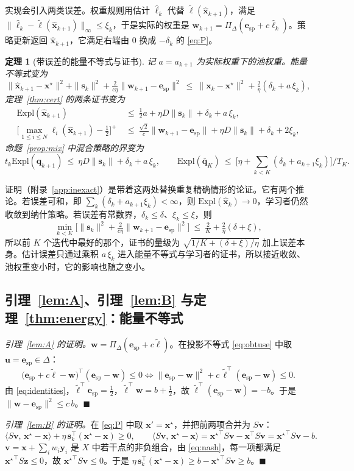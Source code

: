 \documentclass{article}
\theoremstyle{plain}
\newtheorem{theorem}{定理}[section]
\theoremstyle{remark}
\newcommand{\Expl}{\mathrm{Expl}}
\newcommand{\Proj}{\Pi}
\newcommand{\simplex}{\Delta}
\newcommand{\bx}{{\bm{x}}}
\newcommand{\by}{{\bm{y}}}
\newcommand{\bv}{{\bm{v}}}
\newcommand{\bw}{{\bm{w}}}
\newcommand{\bz}{{\bm{z}}}
\newcommand{\bu}{{\bm{u}}}
\newcommand{\bq}{{\bm{q}}}
\newcommand{\be}{{\bm{e}}}
\newcommand{\bell}{{\bm{\ell}}}
\newcommand{\aug}{\tilde{\bell}}
\newcommand{\xs}{\bx^{\star}}
\newcommand{\dx}{{\bm{s}}}
\newcommand{\esp}{\be_{\mathrm{sp}}}
\begin{document}
实现会引入两类误差。权重规则用估计 $\hat{\bell}_k$ 代替 $\aug(\hat \bx_{k+1})$，满足 $\|\hat{\bell}_k-\aug(\hat \bx_{k+1})\|_\infty\le\xi_k$，于是实际的权重是 $\bw_{k+1}=\Proj_\simplex(\esp+c\hat{\bell}_k)$。策略更新返回 $\hat \bx_{k+1}$，它满足右端由 $0$ 换成 $-\delta_k$ 的 \eqref{eq:P}。
\begin{theorem}[带误差的能量不等式与证书]
\label{thm:inexact}
记 $a=a_{k+1}$ 为实际权重下的池权重。能量不等式变为
\[
\|\hat \bx_{k+1}-\xs\|^2+\|\dx_k\|^2+\tfrac{2}{c\eta}\|\bw_{k+1}-\esp\|^2\ \le\ \|\bx_k-\xs\|^2+\tfrac2\eta(\delta_k+a\,\xi_k),
\]
定理~\ref{thm:cert} 的两条证书变为
\begin{align*}
\Expl(\hat \bx_{k+1})&\ \le\ \tfrac12a+\eta D\|\dx_k\|+\delta_k+a\,\xi_k,\\
\Big[\max_{1\le i\le N}\ell_i(\hat \bx_{k+1})-\tfrac12\Big]^+&\ \le\ \tfrac{\sqrt2}{c}\|\bw_{k+1}-\esp\|+\eta D\|\dx_k\|+\delta_k+2\xi_k,
\end{align*}
命题~\ref{prop:mix} 中混合策略的界变为
\[
t_k\Expl(\bq_{k+1})\ \le\ \eta D\|\dx_k\|+\delta_k+a\,\xi_k,\qquad
\Expl(\bar{\bq}_K)\ \le\ \Big[\eta+\textstyle\sum_{k<K}(\delta_k+a_{k+1}\xi_k)\Big]\big/T_K .
\]
\end{theorem}
证明（附录~\ref{app:inexact}）是带着这两处替换重复精确情形的论证。它有两个推论。若误差可和，即 $\sum_k(\delta_k+a_{k+1}\xi_k)<\infty$，则 $\Expl(\hat\bx_k)\to0$，学习者仍然收敛到纳什策略。若误差有常数界，$\delta_k\le\delta$、$\xi_k\le\xi$，则
\[
\min_{k<K}\Big[\|\dx_k\|^2+\tfrac{2}{c\eta}\|\bw_{k+1}-\esp\|^2\Big]\ \le\ \tfrac2K+\tfrac2\eta(\delta+\xi) ,
\]
所以前 $K$ 个迭代中最好的那个，证书的量级为 $\sqrt{1/K+(\delta+\xi)/\eta}$ 加上误差本身。估计误差只通过乘积 $a\,\xi_k$ 进入能量不等式与学习者的证书，所以接近收敛、池权重变小时，它的影响也随之变小。

\subsection{引理~\ref{lem:A}、引理~\ref{lem:B} 与定理~\ref{thm:energy}：能量不等式}
\label{app:energy}

\textit{引理~\ref{lem:A} 的证明。}$\bw=\Proj_\simplex(\esp+c\aug)$。在投影不等式 \eqref{eq:obtuse} 中取 $\bu=\esp\in\simplex$：
\[
\big(\esp+c\aug-\bw\big)^\top(\esp-\bw)\le0
\iff\|\esp-\bw\|^2+c\,\aug^\top(\esp-\bw)\le0 .
\]
由 \eqref{eq:identities}，$\aug^\top \esp=\tfrac12$，$\aug^\top \bw=b+\tfrac12$，故 $\aug^\top(\esp-\bw)=-b$。于是 $\|\bw-\esp\|^2\le c\,b$。\hfill$\blacksquare$

\textit{引理~\ref{lem:B} 的证明。}在 \eqref{eq:P} 中取 $\bx'=\xs$，并把前两项合并为 $S\bv$：
\[
\langle S\bv,\,\xs-\bx\rangle+\eta\,\dx_k^\top(\xs-\bx)\ge0,\qquad
\langle S\bv,\,\xs-\bx\rangle={\xs}^\top S\bv-\bx^\top S\bv={\xs}^\top S\bv-b .
\]
$\bv=\bx+\sum_iw_i\by_i$ 是 $X$ 中若干点的非负组合，由 \eqref{eq:nash}，每一项都满足 ${\xs}^\top S\bz\le0$，故 ${\xs}^\top S\bv\le0$。于是 $\eta\,\dx_k^\top(\xs-\bx)\ge b-{\xs}^\top S\bv\ge b$。\hfill$\blacksquare$
\end{document}
